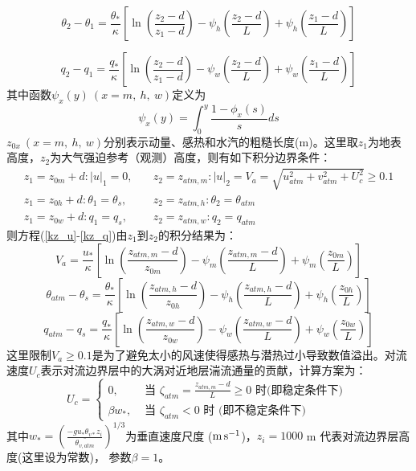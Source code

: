 \begin{equation}
\theta_{2}-\theta_{1}=\frac{\theta_{*}}{\kappa}\left[\ln \left(\frac{z_{2}-d}{z_{1}-d}\right)-\psi_{h}\left(\frac{z_{2}-d}{L}\right)+\psi_{h}\left(\frac{z_{1}-d}{L}\right)\right]
\end{equation}

\begin{equation}
q_{2}-q_{1}=\frac{q_{*}}{\kappa}\left[\ln \left(\frac{z_{2}-d}{z_{1}-d}\right)-\psi_{w}\left(\frac{z_{2}-d}{L}\right)+\psi_{w}\left(\frac{z_{1}-d}{L}\right)\right]
\end{equation}
其中函数$\psi_x\left(y\right)\ (x=m,\ h,\ w)$定义为
\begin{equation}
\psi_{x}(y)=\int_{0}^{y} \frac{1-\phi_{x}(s)}{s} d s
\end{equation}
$z_{0x}\ (x=m,\ h,\ w)$分别表示动量、感热和水汽的粗糙长度(m)。这里取$z_1$为地表高度，$z_2$为大气强迫参考（观测）高度，则有如下积分边界条件：
\begin{equation}\label{VaIni}
\begin{array}{ll}z_{1}=z_{0 m}+d:|u|_{1}=0, \quad & z_{2}=z_{atm, m}: |u|_{2}=V_{a}=\sqrt{u_{atm}^{2}+v_{atm}^{2}+U_{c}^{2}} \geq 0.1 \\ 
     z_{1}=z_{0 h}+d: \theta_{1}=\theta_{s}, & z_{2}=z_{atm, h}: \theta_{2}=\theta_{atm} \\ 
     z_{1}=z_{0 w}+d: q_{1}=q_{s}, & z_{2}=z_{atm, w}: q_{2}=q_{atm}\end{array}
\end{equation}
则方程(\ref{kz_u}-\ref{kz_q})由$z_1$到$z_2$的积分结果为：
\begin{equation}\label{Va}
V_{a}=\frac{u_{*}}{\kappa}\left[\ln \left(\frac{z_{atm, m}-d}{z_{0 m}}\right)-\psi_{m}\left(\frac{z_{atm, m}-d}{L}\right)+\psi_{m}\left(\frac{z_{0 m}}{L}\right)\right]
\end{equation}
\begin{equation}\label{theta_atm-theta_s}
\theta_{atm}-\theta_{s}=\frac{\theta_{*}}{\kappa}\left[\ln \left(\frac{z_{atm, h}-d}{z_{0 h}}\right)-\psi_{h}\left(\frac{z_{atm, h}-d}{L}\right)+\psi_{h}\left(\frac{z_{0 h}}{L}\right)\right]
\end{equation}
\begin{equation}\label{q_atm-qs}
q_{atm}-q_{s}=\frac{q_{*}}{\kappa}\left[\ln \left(\frac{z_{atm, w}-d}{z_{0 w}}\right)-\psi_{w}\left(\frac{z_{atm, w}-d}{L}\right)+\psi_{w}\left(\frac{z_{0 w}}{L}\right)\right]
\end{equation}
这里限制$V_a\geq0.1$是为了避免太小的风速使得感热与潜热过小导致数值溢出。对流速度$U_c$表示对流边界层中的大涡对近地层湍流通量的贡献，计算方案为：
\begin{equation}
U_{c}= \begin{cases}
 0, & \text { 当 } \zeta_{atm}=\frac{z_{atm, m}-d}{L} \geq 0 \text { 时(即稳定条件下) } \\
\beta w_{*}, & \text { 当 } \zeta_{atm}<0 \text { 时 (即不稳定条件下) }
\end{cases}
\end{equation}
其中$w_\ast={(\frac{-gu_\ast\theta_{v\ast}z_i}{\bar{\theta_{v,atm}}})}^{1/3}$为垂直速度尺度 ($\rm m\,s^{-1}$)，$z_i=1000$ m 代表对流边界层高度(这里设为常数)，
参数$\beta=1$。

